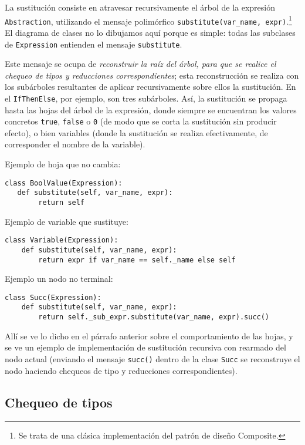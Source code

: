 \documentclass[11pt]{article}
\begin{document}
La sustitución consiste en atravesar recursivamente el árbol de la expresión \lstinline|Abstraction|, utilizando el mensaje polimórfico \lstinline|substitute(var_name, expr)|.\footnote{Se trata de una clásica implementación del patrón de diseño Composite.}
El diagrama de clases no lo dibujamos aquí porque es simple: todas las subclases de \lstinline|Expression| entienden el mensaje \lstinline|substitute|.

Este mensaje se ocupa de \emph{reconstruir la raíz del árbol, para que se realice el chequeo de tipos y reducciones correspondientes}; esta reconstrucción se realiza con los subárboles resultantes de aplicar recursivamente sobre ellos la sustitución. En el \lstinline|IfThenElse|, por ejemplo, son tres subárboles. Así, la sustitución se propaga hasta las hojas del árbol de la expresión, donde siempre se encuentran los valores concretos \verb|true|, \verb|false| o \verb|0| (de modo que se corta la sustitución sin producir efecto), o bien variables (donde la sustitución se realiza efectivamente, de corresponder el nombre de la variable).

Ejemplo de hoja que no cambia:
\begin{lstlisting}
class BoolValue(Expression):
   def substitute(self, var_name, expr):
        return self
\end{lstlisting}
        
Ejemplo de variable que sustituye:
\begin{lstlisting}
class Variable(Expression):
    def substitute(self, var_name, expr):
        return expr if var_name == self._name else self
\end{lstlisting}

Ejemplo un nodo no terminal:
\begin{lstlisting}
class Succ(Expression):
    def substitute(self, var_name, expr):
        return self._sub_expr.substitute(var_name, expr).succ()
\end{lstlisting}
        
Allí se ve lo dicho en el párrafo anterior sobre el comportamiento de las hojas, y se ve un ejemplo de implementación de sustitución recursiva con rearmado del nodo actual (enviando el mensaje \lstinline|succ()| dentro de la clase \lstinline|Succ| se reconstruye el nodo haciendo chequeos de tipo y reducciones correspondientes).

\subsection{Chequeo de tipos}
\end{document}
